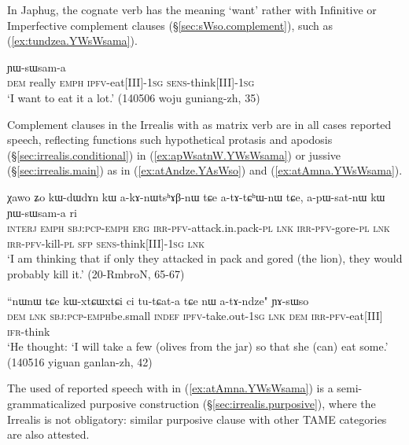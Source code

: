 In Japhug, the cognate verb  has the meaning `want' rather with Infinitive or Imperfective complement clauses (§\ref{sec:sWso.complement}), such as (\ref{ex:tundzea.YWsWsama}).

\begin{exe}
\ex \label{ex:tundzea.YWsWsama}
 ɲɯ-sɯsam-a \\
\textsc{dem} really \textsc{emph} \textsc{ipfv}-eat[III]-\textsc{1sg} \textsc{sens}-think[III]-\textsc{1sg} \\
\glt `I want to eat it a lot.' (140506 woju guniang-zh, 35)
\end{exe}

Complement clauses in the Irrealis with  as matrix verb are in all cases reported speech, reflecting functions such  hypothetical protasis and apodosis (§\ref{sec:irrealis.conditional}) in (\ref{ex:apWsatnW.YWsWsama}) or jussive (§\ref{sec:irrealis.main}) as in (\ref{ex:atAndze.YAsWso}) and (\ref{ex:atAmna.YWsWsama}). 

\begin{exe}
\ex \label{ex:apWsatnW.YWsWsama}
\gll  χawo ʑo kɯ-dɯ\redp{}dɤn kɯ a-kɤ-nɯtsʰɤβ-nɯ tɕe a-tɤ-tɕʰɯ-nɯ tɕe, a-pɯ-sat-nɯ kɯ ɲɯ-sɯsam-a ri \\
\textsc{interj} \textsc{emph} \textsc{sbj}:\textsc{pcp}-\textsc{emph}\redp{} \textsc{erg} \textsc{irr}-\textsc{pfv}-attack.in.pack-\textsc{pl} \textsc{lnk} \textsc{irr}-\textsc{pfv}-gore-\textsc{pl} \textsc{lnk} \textsc{irr}-\textsc{pfv}-kill-\textsc{pl} \textsc{sfp} \textsc{sens}-think[III]-\textsc{1sg} \textsc{lnk} \\
\glt `I am thinking that if only they attacked in pack and gored (the lion), they would probably kill it.' (20-RmbroN, 65-67)
\end{exe}


\begin{exe}
\ex \label{ex:atAndze.YAsWso}
\gll ``nɯnɯ tɕe kɯ-xtɕɯ\redp{}xtɕi ci tu-tɕat-a tɕe nɯ a-tɤ-ndze" ɲɤ-sɯso \\
\textsc{dem} \textsc{lnk} \textsc{sbj}:\textsc{pcp}-\textsc{emph}\redp{}be.small \textsc{indef} \textsc{ipfv}-take.out-\textsc{1sg} \textsc{lnk} \textsc{dem} \textsc{irr}-\textsc{pfv}-eat[III] \textsc{ifr}-think \\
\glt `He thought: `I will take a few (olives from the jar) so that she (can) eat some.' (140516 yiguan ganlan-zh, 42)
\end{exe}


The used of reported speech with  in (\ref{ex:atAmna.YWsWsama}) is a semi-grammaticalized purposive construction (§\ref{sec:irrealis.purposive}), where the Irrealis is not obligatory: similar purposive clause with other TAME categories are also attested.

